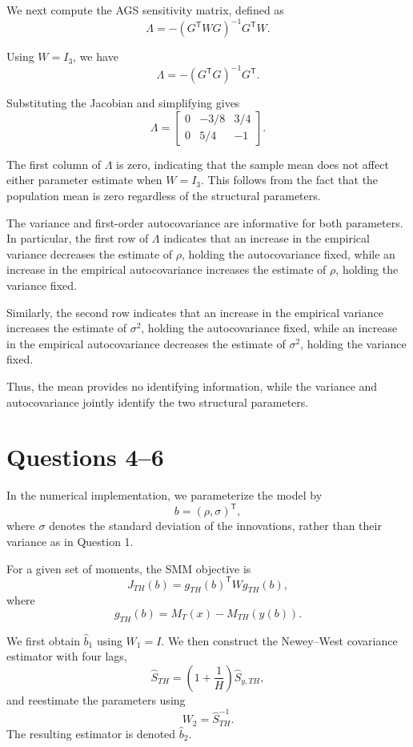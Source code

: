 \documentclass{article}
\begin{document}
We next compute the AGS sensitivity matrix, defined as
\[
    \Lambda
    =
    -(G^{\mathsf T}WG)^{-1}G^{\mathsf T}W.
\]

Using $W=I_3$, we have
\[
    \Lambda
    =
    -(G^{\mathsf T}G)^{-1}G^{\mathsf T}.
\]

Substituting the Jacobian and simplifying gives
\[
    \Lambda
    =
    \begin{bmatrix}
        0 & -3/8 & 3/4\\
        0 & 5/4 & -1
    \end{bmatrix}.
\]

The first column of $\Lambda$ is zero, indicating that the
sample mean does not affect either parameter estimate when
$W=I_3$. This follows from the fact that the population mean
is zero regardless of the structural parameters.

The variance and first-order autocovariance are informative
for both parameters. In particular, the first row of $\Lambda$
indicates that an increase in the empirical variance decreases
the estimate of $\rho$, holding the autocovariance fixed,
while an increase in the empirical autocovariance increases
the estimate of $\rho$, holding the variance fixed.

Similarly, the second row indicates that an increase in
the empirical variance increases the estimate of $\sigma^2$,
holding the autocovariance fixed, while an increase in the
empirical autocovariance decreases the estimate of $\sigma^2$,
holding the variance fixed.

Thus, the mean provides no identifying information, while
the variance and autocovariance jointly identify the two
structural parameters.

\section*{Questions 4--6}

In the numerical implementation, we
parameterize the model by
\[
    b = (\rho,\sigma)^{\mathsf T},
\]
where $\sigma$ denotes the standard deviation of the innovations,
rather than their variance as in Question 1.

For a given set of moments, the SMM objective is
\[
    J_{TH}(b)
    =
    g_{TH}(b)^{\mathsf T}Wg_{TH}(b),
\]
where
\[
    g_{TH}(b)
    =
    M_T(x)-M_{TH}(y(b)).
\]

We first obtain $\widehat b_1$ using $W_1=I$. We then construct
the Newey--West covariance estimator with four lags,
\[
    \widehat S_{TH}
    =
    \left(1+\frac{1}{H}\right)
    \widehat S_{y,TH},
\]
and reestimate the parameters using
\[
    W_2=\widehat S_{TH}^{-1}.
\]
The resulting estimator is denoted $\widehat b_2$.
\end{document}
